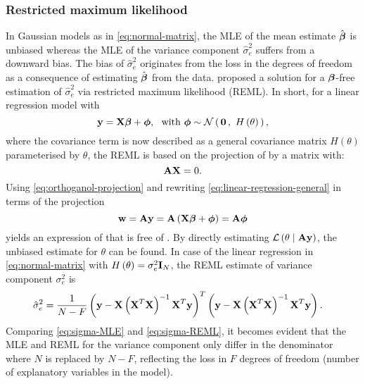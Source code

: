 \subsubsection{Restricted maximum likelihood}
\label{subsubsection:REML}
In Gaussian models as in \cref{eq:normal-matrix}, the MLE of the mean estimate \(\hat{\boldsymbol{\mathbf{\beta}}}\) is unbiased  whereas the MLE of the variance component \(\hat{\sigma}^2_e \) suffers from a downward bias. The bias of \(\hat{\sigma}^2_e \) originates from the loss in the degrees of freedom as a consequence of estimating \(\hat{\boldsymbol{\mathbf{\beta}}}\) from the data.  proposed a solution for a \(\boldsymbol{\mathbf{\beta}}\)-free estimation of \(\hat{\sigma}^2_e \) via restricted maximum likelihood (REML). In short, for a linear regression model with 
\begin{equation}
\boldsymbol{\mathbf{y}} = \boldsymbol{\mathbf{X}}\boldsymbol{\mathbf{\beta}} + \boldsymbol{\mathbf{\phi}}, \,\,\,\, \text{with }  \boldsymbol{\mathbf{\phi}} \sim  \mathcal{N}\left(\,{\boldsymbol{\mathbf{0}}}\,,~{H\left(\theta\right)}\,\right),
\label{eq:linear-regression-general}
\end{equation}
%
where the covariance term is now described as a general covariance matrix \(H\left(\theta\right)\) parameterised by \(\theta\), the REML  is based on the projection  of  by a matrix  with:
\begin{equation}
\label{eq:orthoganol-projection}
\boldsymbol{\mathbf{A}}\boldsymbol{\mathbf{X}}=0.
\end{equation}
%
Using \cref{eq:orthoganol-projection} and rewriting \cref{eq:linear-regression-general} in terms of the projection 
\begin{equation}
\boldsymbol{\mathbf{w}} = \boldsymbol{\mathbf{A}}\boldsymbol{\mathbf{y}} = \boldsymbol{\mathbf{A}}\left(\boldsymbol{\mathbf{X}}\boldsymbol{\mathbf{\beta}} + \boldsymbol{\mathbf{\phi}}\right) = \boldsymbol{\mathbf{A}}\boldsymbol{\mathbf{\phi}} 
\end{equation}
%
yields an expression of  that is free of \tmat{\beta}. By directly estimating \(\mathcal{L} \left(\theta \mid \boldsymbol{\mathbf{A}}\boldsymbol{\mathbf{y}}\right)\), the unbiased estimate for \(\theta\) can be found. In case of the linear regression in \cref{eq:normal-matrix} with \(H\left(\theta\right) = \sigma^2_e \boldsymbol{\mathbf{I}}_{N}\), the REML estimate of variance component \(\sigma^2_e\) is
\begin{align}
\hat{\sigma}^2_e &= \frac{1}{N-F}\left(\boldsymbol{\mathbf{y}} -\boldsymbol{\mathbf{X}}\left(\boldsymbol{\mathbf{X}}^T\boldsymbol{\mathbf{X}}\right)^{-1}\boldsymbol{\mathbf{X}}^T\boldsymbol{\mathbf{y}}\right)^T\left(\boldsymbol{\mathbf{y}} -\boldsymbol{\mathbf{X}}\left(\boldsymbol{\mathbf{X}}^T\boldsymbol{\mathbf{X}}\right)^{-1}\boldsymbol{\mathbf{X}}^T\boldsymbol{\mathbf{y}}\right).
\label{eq:sigma-REML}
\end{align}
%
Comparing \cref{eq:sigma-MLE} and \cref{eq:sigma-REML}, it becomes evident that the MLE and REML for the variance component only differ in the denominator where \(N\) is replaced by \(N-F\), reflecting the loss in \(F\) degrees of freedom (number of explanatory variables in the model). 

